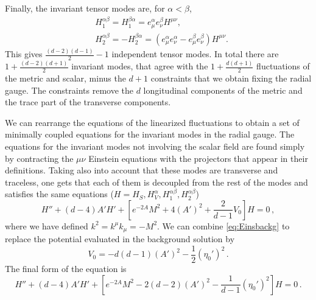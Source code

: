 Finally, the invariant tensor modes are, for $\alpha< \beta$,
\begin{equation}
\begin{split}
&H_1^{\alpha\beta}=H_1^{\beta\alpha}=e^{\alpha}_\mu e^{\beta}_\nu H^{\mu\nu},\\
&H_2^{\alpha\beta}=-H_2^{\beta\alpha}=(e_\mu^{\alpha}e_\nu^{\alpha}-e_\mu^{\beta}e_\nu^{\beta})H^{\mu\nu}.
\end{split}
\end{equation}
This gives $\frac{(d-2)(d-1)}{2}-1$ independent tensor modes.
In total there are $1+\frac{(d-2)(d+1)}{2}$
invariant modes, that agree with the $1+\frac{d(d+1)}{2}$ fluctuations of the metric and scalar, minus the $d+1$ constraints that we obtain fixing the radial gauge.
The constraints remove the $d$ longitudinal components of the metric and the trace part of the transverse components.

We can rearrange the equations of the linearized fluctuations to obtain a set of minimally coupled equations for the invariant modes in the radial gauge.
The equations for the invariant modes not involving the scalar field are found simply by contracting the $\mu\nu$ Einstein equations with the projectors that appear in their definitions.
Taking also into account that these modes are transverse and traceless, one gets that each of them is decoupled from the rest of the modes and satisfies the same equations ($H=H_S, H_V^\alpha,H_1^{\alpha\beta},H_2^{\alpha\beta}$)
\begin{equation}
	H''+(d-4)A' H'+\left[e^{-2A}M^2+4(A')^2+\frac{2}{d-1}V_0\right]H=0\,,
\end{equation}
where we have defined $k^2=k^\mu k_\mu=-M^2$.
We can combine \cref{eq:Einsbackg} to replace the potential evaluated in the background solution by
\begin{equation}
	V_0=-d(d-1)(A')^2-\frac{1}{2}(\eta_0')^2\,.
\end{equation}
The final form of the equation is
\begin{equation}\label{eq:invariantHeq}
	H''+(d-4)A' H'+\left[e^{-2A}M^2-2(d-2)(A')^2-\frac{1}{d-1}(\eta_0')^2\right]H=0\,.
\end{equation}

